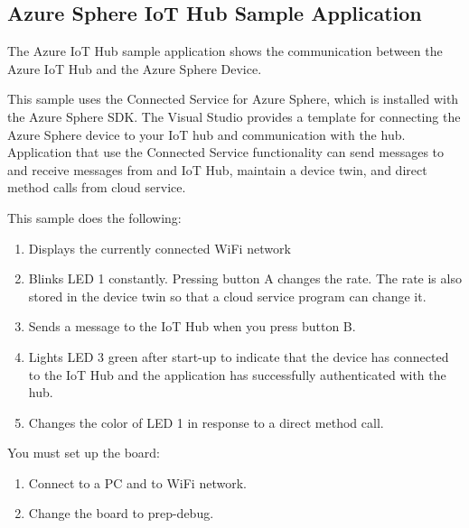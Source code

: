 \subsection{Azure Sphere IoT Hub Sample Application}
The Azure IoT Hub sample application shows the communication between the Azure IoT Hub and the Azure Sphere Device.

This sample uses the Connected Service for Azure Sphere, which is installed with the Azure Sphere SDK. The Visual Studio provides a template for connecting
the Azure Sphere device to your IoT hub and communication with the hub. Application that use the Connected Service functionality can send messages to and 
receive messages from and IoT Hub, maintain a device twin, and direct method calls from cloud service.

This sample does the following:
\begin{enumerate}
    \item Displays the currently connected WiFi network
    \item Blinks LED 1 constantly. Pressing button A changes the rate. The rate is also stored in the device twin so that a cloud service program can change it.
    \item Sends a message to the IoT Hub when you press button B.
    \item Lights LED 3 green after start-up to indicate that the device has connected to the IoT Hub and the application has successfully authenticated with the hub.
    \item Changes the color of LED 1 in response to a direct method call.
\end{enumerate}

You must set up the board:
\begin{enumerate}
    \item Connect to a PC and to WiFi network.
    \item Change the board to prep-debug.
\end{enumerate}

